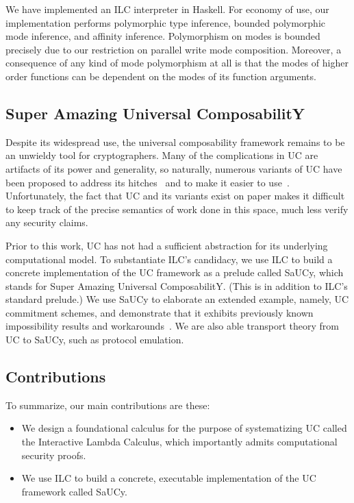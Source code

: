 We have implemented an ILC interpreter in Haskell. For economy of use, our
implementation performs polymorphic type inference, bounded polymorphic mode
inference, and affinity inference. Polymorphism on modes is bounded precisely
due to our restriction on parallel write mode composition. Moreover, a
consequence of any kind of mode polymorphism at all is that the modes of higher
order functions can be dependent on the modes of its function arguments.

\subsection{Super Amazing Universal ComposabilitY}

 Despite its widespread use, the universal
composability framework remains to be an unwieldy tool for cryptographers. Many
of the complications in UC are artifacts of its power and generality, so
naturally, numerous variants of UC have been proposed to address its
hitches~\cite{backes2007reactive, hofheinz2015gnuc, canetti2007universally,
  canetti2003universal} and to make it easier to
use~\cite{canetti2015simpler}. Unfortunately, the fact that UC and its variants
exist on paper makes it difficult to keep track of the precise semantics of work
done in this space, much less verify any security claims.

Prior to this work, UC has not had a sufficient abstraction for its underlying
computational model. To substantiate ILC's candidacy, we use ILC to build a
concrete implementation of the UC framework as a prelude called SaUCy, which
stands for Super Amazing Universal ComposabilitY. (This is in addition to ILC's
standard prelude.) We use SaUCy to elaborate an extended example, namely, UC
commitment schemes, and demonstrate that it exhibits previously known
impossibility results and workarounds~\cite{canetti2001commitments}. We are also
able transport theory from UC to SaUCy, such as protocol emulation.

\subsection{Contributions}
\label{subsec:contributions}

To summarize, our main contributions are these:

\begin{itemize}[leftmargin=*]
  \item We design a foundational calculus for the purpose of systematizing UC
    called the Interactive Lambda Calculus, which importantly admits
    computational security proofs.
  \item We use ILC to build a concrete, executable implementation of the UC
    framework called SaUCy.
\end{itemize}

